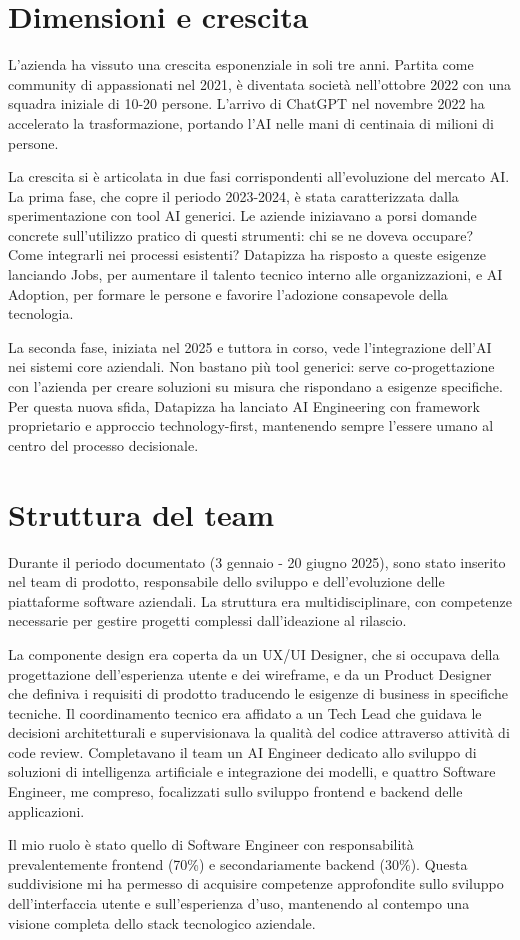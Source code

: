 \section{Dimensioni e crescita}
L'azienda ha vissuto una crescita esponenziale in soli tre anni. Partita 
come community di appassionati nel 2021, è diventata società nell'ottobre 
2022 con una squadra iniziale di 10-20 persone. L'arrivo di ChatGPT nel 
novembre 2022 ha accelerato la trasformazione, portando l'AI nelle mani 
di centinaia di milioni di persone.

\medskip 
La crescita si è articolata in due fasi corrispondenti all'evoluzione del 
mercato AI. La prima fase, che copre il periodo 2023-2024, è stata 
caratterizzata dalla sperimentazione con tool AI generici. Le aziende 
iniziavano a porsi domande concrete sull'utilizzo pratico di questi 
strumenti: chi se ne doveva occupare? Come integrarli nei processi 
esistenti? Datapizza ha risposto a queste esigenze lanciando Jobs, per 
aumentare il talento tecnico interno alle organizzazioni, e AI Adoption, 
per formare le persone e favorire l'adozione consapevole della tecnologia.

\medskip 
La seconda fase, iniziata nel 2025 e tuttora in corso, vede 
l'integrazione dell'AI nei sistemi core aziendali. Non bastano più tool 
generici: serve co-progettazione con l'azienda per creare soluzioni su 
misura che rispondano a esigenze specifiche. Per questa nuova sfida, 
Datapizza ha lanciato AI Engineering con framework proprietario e 
approccio technology-first, mantenendo sempre l'essere umano al centro 
del processo decisionale.

\section{Struttura del team}
Durante il periodo documentato (3 gennaio - 20 giugno 2025), sono stato 
inserito nel team di prodotto, responsabile dello sviluppo e dell'evoluzione 
delle piattaforme software aziendali. La struttura era multidisciplinare, 
con competenze necessarie per gestire progetti complessi dall'ideazione 
al rilascio.

\medskip 
La componente design era coperta da un UX/UI Designer, che si occupava 
della progettazione dell'esperienza utente e dei wireframe, e da un 
Product Designer che definiva i requisiti di prodotto traducendo le 
esigenze di business in specifiche tecniche. Il coordinamento tecnico era 
affidato a un Tech Lead che guidava le decisioni architetturali e 
supervisionava la qualità del codice attraverso attività di code review. 
Completavano il team un AI Engineer dedicato allo sviluppo di soluzioni 
di intelligenza artificiale e integrazione dei modelli, e quattro Software 
Engineer, me compreso, focalizzati sullo sviluppo frontend e backend delle 
applicazioni.

\medskip 
Il mio ruolo è stato quello di Software Engineer con responsabilità 
prevalentemente frontend (70\%) e secondariamente backend (30\%). Questa 
suddivisione mi ha permesso di acquisire competenze approfondite sullo 
sviluppo dell'interfaccia utente e sull'esperienza d'uso, mantenendo al 
contempo una visione completa dello stack tecnologico aziendale.